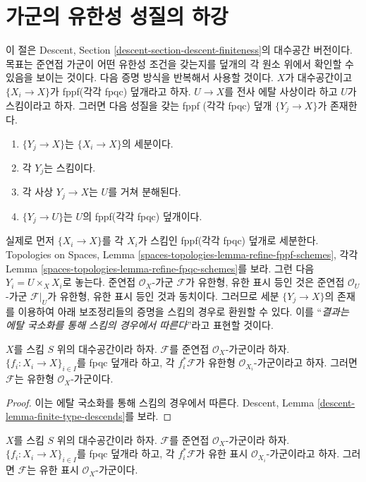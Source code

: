 \section{가군의 유한성 성질의 하강}
\label{section-descent-finiteness}

\noindent
이 절은 Descent, Section \ref{descent-section-descent-finiteness}의
대수공간 버전이다. 목표는 준연접 가군이 어떤 유한성 조건을 갖는지를
덮개의 각 원소 위에서 확인할 수 있음을 보이는 것이다.
다음 증명 방식을 반복해서 사용할 것이다. $X$가 대수공간이고
$\{X_i\to X\}$가 fppf(각각 fpqc) 덮개라고 하자. $U\to X$를 전사 에탈
사상이라 하고 $U$가 스킴이라고 하자. 그러면 다음 성질을 갖는 fppf
(각각 fpqc) 덮개 $\{Y_j\to X\}$가 존재한다.
\begin{enumerate}
\item $\{Y_j\to X\}$는 $\{X_i\to X\}$의 세분이다.
\item 각 $Y_j$는 스킴이다.
\item 각 사상 $Y_j\to X$는 $U$를 거쳐 분해된다.
\item $\{Y_j\to U\}$는 $U$의 fppf(각각 fpqc) 덮개이다.
\end{enumerate}
실제로 먼저 $\{X_i\to X\}$를 각 $X_i$가 스킴인 fppf(각각 fpqc)
덮개로 세분한다. Topologies on Spaces, Lemma
\ref{spaces-topologies-lemma-refine-fppf-schemes}, 각각 Lemma
\ref{spaces-topologies-lemma-refine-fpqc-schemes}를 보라. 그런 다음
$Y_i=U\times_XX_i$로 놓는다. 준연접 $\mathcal{O}_X$-가군
$\mathcal{F}$가 유한형, 유한 표시 등인 것은 준연접
$\mathcal{O}_U$-가군 $\mathcal{F}|_U$가 유한형, 유한 표시 등인 것과
동치이다. 그러므로 세분 $\{Y_j\to X\}$의 존재를 이용하여 아래
보조정리들의 증명을 스킴의 경우로 환원할 수 있다. 이를 ``{\it 결과는
에탈 국소화를 통해 스킴의 경우에서 따른다}''라고 표현할 것이다.

\begin{lemma}
\label{lemma-finite-type-descends}
$X$를 스킴 $S$ 위의 대수공간이라 하자. $\mathcal{F}$를 준연접
$\mathcal{O}_X$-가군이라 하자. $\{f_i:X_i\to X\}_{i\in I}$를 fpqc
덮개라 하고, 각 $f_i^*\mathcal{F}$가 유한형
$\mathcal{O}_{X_i}$-가군이라고 하자. 그러면 $\mathcal{F}$는 유한형
$\mathcal{O}_X$-가군이다.
\end{lemma}

\begin{proof}
이는 에탈 국소화를 통해 스킴의 경우에서 따른다. Descent, Lemma
\ref{descent-lemma-finite-type-descends}를 보라.
\end{proof}

\begin{lemma}
\label{lemma-finite-presentation-descends}
$X$를 스킴 $S$ 위의 대수공간이라 하자. $\mathcal{F}$를 준연접
$\mathcal{O}_X$-가군이라 하자. $\{f_i:X_i\to X\}_{i\in I}$를 fpqc
덮개라 하고, 각 $f_i^*\mathcal{F}$가 유한 표시
$\mathcal{O}_{X_i}$-가군이라고 하자. 그러면 $\mathcal{F}$는 유한 표시
$\mathcal{O}_X$-가군이다.
\end{lemma}

